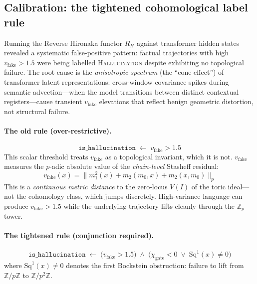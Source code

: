 \documentclass[11pt,a4paper]{article}
\begin{document}
\subsection{Calibration: the tightened cohomological label rule}
\label{sec:calibration}

Running the Reverse Hironaka functor $R_H$ against transformer hidden
states revealed a systematic false-positive pattern:
factual trajectories with high $v_{\text{fake}} > 1.5$ were being
labelled \textsc{Hallucination} despite exhibiting no topological failure.
The root cause is the \emph{anisotropic spectrum} (the ``cone effect'')
of transformer latent representations:
cross-window covariance spikes during semantic advection---when the
model transitions between distinct contextual registers---cause transient
$v_{\text{fake}}$ elevations that reflect benign geometric distortion,
not structural failure.

\paragraph{The old rule (over-restrictive).}
\begin{equation}
  \texttt{is\_hallucination} \;\leftarrow\; v_{\text{fake}} > 1.5
  \label{eq:old-rule}
\end{equation}
This scalar threshold treats $v_{\text{fake}}$ as a topological
invariant, which it is not.
$v_{\text{fake}}$ measures the $p$-adic absolute value of the
\emph{chain-level} Stasheff residual:
\[
  v_{\text{fake}}(x) = \bigl\| m_1^2(x) + m_2(m_0, x) + m_2(x, m_0) \bigr\|_p
\]
This is a \emph{continuous metric distance} to the zero-locus $V(I)$
of the toric ideal---not the cohomology class, which jumps discretely.
High-variance language can produce $v_{\text{fake}} > 1.5$
while the underlying trajectory lifts cleanly through the $\mathbb{Z}_p$ tower.

\paragraph{The tightened rule (conjunction required).}
\begin{equation}
  \texttt{is\_hallucination} \;\leftarrow\;
  \bigl(v_{\text{fake}} > 1.5\bigr)
  \;\wedge\;
  \bigl(\chi_{\text{gate}} < 0 \;\vee\; \mathrm{Sq}^1(x) \neq 0 \bigr)
  \label{eq:tightened-rule}
\end{equation}
where $\mathrm{Sq}^1(x) \neq 0$ denotes the first Bockstein obstruction:
failure to lift from $\mathbb{Z}/p\mathbb{Z}$ to $\mathbb{Z}/p^2\mathbb{Z}$.
\end{document}
